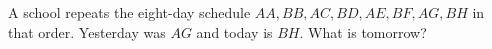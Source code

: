 A school repeats the eight-day schedule $AA,BB,AC,BD,AE,BF,AG,BH$ in that order. Yesterday was $AG$ and today is $BH$. What is tomorrow?

